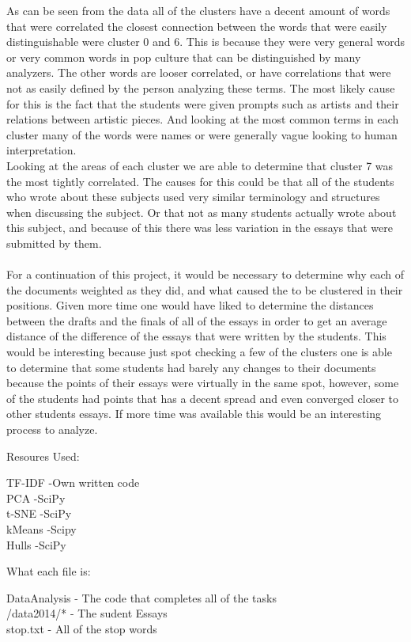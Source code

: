\documentclass{article}
\begin{document}
\begin{addmargin}[4em]{4em}


\end{addmargin}
\begin{addmargin}[4em]{4em}
As can be seen from the data all of the clusters have a decent amount of words that were correlated the closest connection between the words that were easily distinguishable were cluster 0 and  6. This is because they were very general words or very common words in pop culture that can be distinguished by many analyzers. The other words are looser correlated, or have correlations that were not as easily defined by the person analyzing these terms. The most likely cause for this is the fact that the students were given prompts such as artists and their relations between artistic pieces. And looking at the most common terms in each cluster many of the words were names or were generally vague looking to human interpretation.\\
Looking at the areas of each cluster we are able to determine that cluster 7 was the most tightly correlated. The causes for this could be that all of the students who wrote about these subjects used very similar terminology and structures when discussing the subject. Or that not as many students actually wrote about this subject, and because of this there was less variation in the essays that were submitted by them. \\
\\
For a continuation of this project, it would be necessary to determine why each of the documents weighted as they did, and what caused the to be clustered in their positions. Given more time one would have liked to determine the distances between the drafts and the finals of all of the essays in order to get an average distance of the difference of the essays that were written by the students. This would be interesting because just spot checking a few of the clusters one is able to determine that some students had barely any changes to their documents because the points of their essays were virtually in the same spot, however, some of the students had points that has a decent spread and even converged closer to other students essays. If more time was available this would be an interesting process to analyze. \\

\end{addmargin}
Resoures Used:
\begin{addmargin}[4em]{4em}
TF-IDF -Own written code\\
PCA    -SciPy\\
t-SNE  -SciPy\\
kMeans -Scipy\\
Hulls  -SciPy\\
\end{addmargin}


What each file is:
\begin{addmargin}[4em]{4em}
DataAnalysis - The code that completes all of the tasks\\
/data2014/* - The sudent Essays\\
stop.txt - All of the stop words\\
\end{addmargin}
\end{document}
